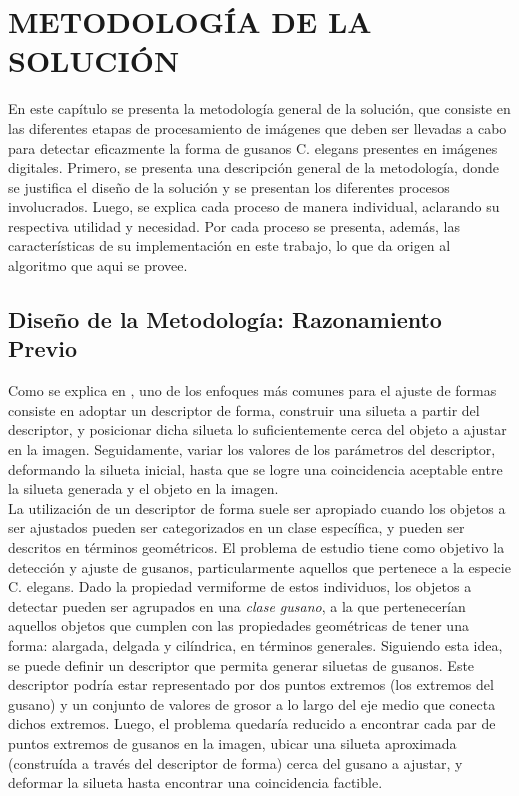 \thispagestyle{empty}
\cleardoublepage  
\chapter{METODOLOG\'IA DE LA SOLUCI\'ON}
\label{chap:methodology}

En este cap\'itulo se presenta la metodolog\'ia general de la soluci\'on,
que consiste en las diferentes etapas de procesamiento de im\'agenes que deben ser
llevadas a cabo para detectar eficazmente la forma de gusanos C. elegans presentes
en im\'agenes digitales. Primero, se presenta una descripci\'on general de la 
metodolog\'ia, donde se justifica el dise\~no de la soluci\'on y se presentan los 
diferentes procesos involucrados.
Luego, se explica cada proceso de manera individual, aclarando su respectiva utilidad y necesidad.
Por cada proceso se presenta, adem\'as, las caracter\'isticas de su implementaci\'on en este trabajo,
lo que da origen al algoritmo que aqui se provee.

\section{Dise\~no de la Metodolog\'ia: Razonamiento Previo}
\label{sec:reasoning}

Como se explica en \cite{binaryshape,deformable,matching2,matchingbook},
uno de los enfoques m\'as comunes para el ajuste de formas consiste en adoptar
un descriptor de forma, construir una silueta a partir del descriptor,
y posicionar dicha silueta lo suficientemente cerca del objeto a ajustar en
la imagen. Seguidamente, variar los valores de los par\'ametros 
del descriptor, deformando la silueta inicial, hasta que se logre una 
coincidencia aceptable entre la silueta generada y el objeto en la imagen.\\
 
La utilizaci\'on de un descriptor de forma suele ser apropiado
cuando los objetos a ser ajustados pueden ser categorizados
en un clase espec\'ifica, y pueden ser descritos
en t\'erminos geom\'etricos.
El problema de estudio tiene como objetivo la detecci\'on y ajuste
de gusanos, particularmente aquellos que pertenece a la especie
C. elegans. Dado la propiedad vermiforme de estos individuos, los
objetos a detectar pueden ser agrupados en una \emph{clase gusano},
a la que pertenecer\'ian aquellos objetos que cumplen con las propiedades
geom\'etricas de tener una forma: alargada, delgada y cil\'indrica, en
t\'erminos generales.
Siguiendo esta idea, se puede definir un descriptor que 
permita generar siluetas de gusanos. Este descriptor podr\'ia
estar representado por dos puntos extremos (los extremos del gusano)
y un conjunto de valores de grosor a lo largo del eje medio que
conecta dichos extremos. Luego, el problema quedar\'ia
reducido a encontrar cada par de puntos extremos de gusanos en la
imagen, ubicar una silueta aproximada (constru\'ida a trav\'es
del descriptor de forma) cerca del gusano a ajustar, y deformar 
la silueta hasta encontrar una coincidencia factible.\\


